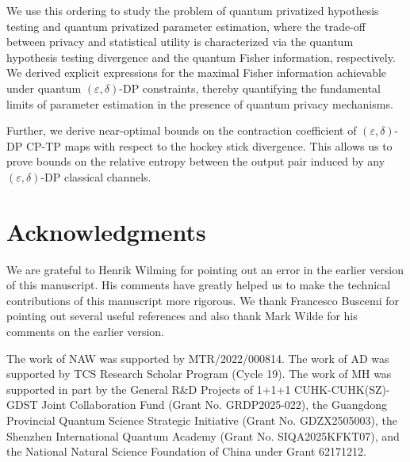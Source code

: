 \documentclass[onecolumn,ldraftcls, 11pt]{IEEEtran}
\newcommand{\eps}{\varepsilon}
\begin{document}
 We use this ordering to study the problem of quantum privatized hypothesis testing and quantum privatized parameter estimation, where the trade-off between privacy and statistical utility is characterized via the quantum hypothesis testing divergence and the quantum Fisher information, respectively. We derived explicit expressions for the maximal Fisher information achievable under quantum $(\eps,\delta)$-DP constraints, thereby quantifying the fundamental limits of parameter estimation in the presence of quantum privacy mechanisms. 

Further, we derive near-optimal bounds on the contraction coefficient of $(\eps,\delta)$-DP CP-TP maps with respect to the hockey stick divergence. This allows us to prove bounds on the relative entropy between the output pair induced by any $(\eps,\delta)$-DP classical channels. 

\section*{Acknowledgments}

We are grateful to Henrik Wilming for pointing out an error in the earlier version of this manuscript. His comments have greatly helped us to make the technical contributions of this manuscript more rigorous. We thank Francesco Buscemi for pointing out several useful references and also thank Mark Wilde for his comments on the earlier version.


The work of NAW was supported by MTR/2022/000814. The work of AD was supported by TCS Research Scholar Program (Cycle 19). The work of MH was supported in part by the General R\&D Projects of 1+1+1 CUHK-CUHK(SZ)-GDST Joint Collaboration Fund (Grant No. GRDP2025-022), the Guangdong Provincial Quantum Science Strategic Initiative (Grant No. GDZX2505003), the Shenzhen International Quantum Academy (Grant No. SIQA2025KFKT07), and the National Natural Science Foundation of China under Grant 62171212.
 






\appendix
\end{document}
